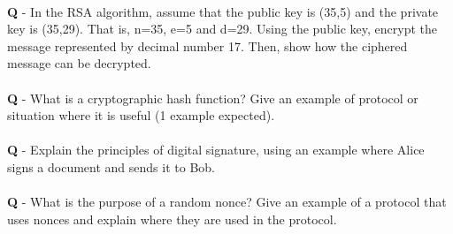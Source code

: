 \documentclass{llncs}
\newcounter{ques}
\renewcommand{\question}[1]{\paragraph{}\textbf{Q\theques} - #1\stepcounter{ques} }
\newcommand{\answer}[1]{}%
\begin{document}
\answer{Symmetric cryptography is faster than asymmetric
  cryptography. However, symmetric cryptography requires a shared
  secret to be sent over a secure channel while asymmetric
  cryptography does not. }

\newpage

\question{In the RSA algorithm, assume that the public key is (35,5)
  and the private key is (35,29). That is, n=35, e=5 and d=29. Using
  the public key, encrypt the message represented by decimal
  number 17. Then, show how the ciphered message can be decrypted.}

\answer{See slide 23. Encryption: $17^{5}\quad \mathrm{mod}\quad 35 =
  12$. Decryption: $12^{29}\quad \mathrm{mod}\quad 35 = 17$.}

\newpage

\question{What is a cryptographic hash function? Give an example of
  protocol or situation where it is useful (1 example expected).}

\answer{A cryptographic hash function is a many-to-1, one-way function
  that produces a fixed-size digest from a message of arbitrary
  size. Hash functions are used for digital signatures so that only a
  short message digest has to be encrypted with asymmetric
  cryptography.}

\newpage

\question{Explain the principles of digital signature, using an
  example where Alice signs a document and sends it to
  Bob.}

\answer{See slide 50. When Alice wants to sign a document, the
  signature consists of the document digest encrypted with Alice's
  private key. When Bob receives the signed document, he (1) computes
  its digest and (2) decrypts the signature using Alice's public
  key. If the results of (1) and (2) match, the document's signature
  is verified.}

\newpage


\question{What is the purpose of a random nonce? Give an example of a
  protocol that uses nonces and explain where they are used in the
  protocol. }

\answer{A nonce is a number used only once in a lifetime. It is used
  to protect against playback attacks where an attacker replays the
  exact same sequence of events than in a previous communication. SSL
  uses nonces in its handshake, to guarantee that encryption and MAC
  keys will be different for every session.  }
\end{document}
